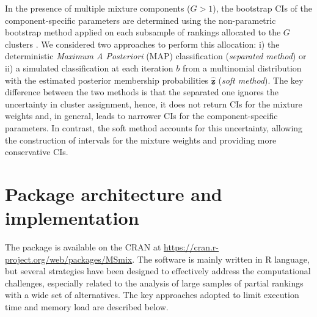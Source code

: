 In the presence of multiple mixture components ($G>1$), the bootstrap CIs of the component-specific parameters are determined using the non-parametric bootstrap method applied on each subsample of rankings allocated to the $G$ clusters \citep{taushanov2019bootstrap}. We considered two approaches to perform this allocation: i) the deterministic \textit{Maximum A Posteriori} (MAP) classification (\textit{separated method}) or ii) a simulated classification at each iteration $b$ from a multinomial distribution with the estimated posterior membership probabilities $\underline{\hat{\bm{z}}}$ (\textit{soft method}). The key difference between the two methods is that the separated one ignores the uncertainty in cluster assignment, hence, it does not return CIs for the mixture weights and, in general, leads to narrower CIs for the component-specific parameters. In contrast, the soft method accounts for this uncertainty, allowing the construction of intervals for the mixture weights and providing more conservative CIs.

\section{Package architecture and implementation}
\label{sec:package_arch}

The  package is available on the CRAN at
\url{https://cran.r-project.org/web/packages/MSmix}. The software is mainly written in \textsf{R} language, but several strategies have been designed to effectively address the computational challenges, especially related to the analysis of large samples of partial rankings with a wide set of alternatives. The key approaches adopted to limit execution time and memory load are described below.

